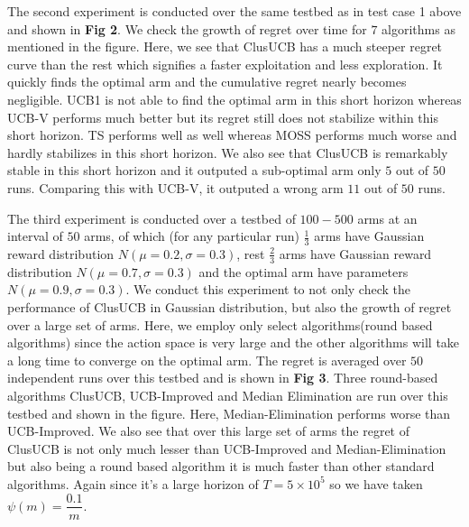 	The second experiment is conducted over the same testbed as in test case 1 above and shown in \textbf{Fig 2}. We check the growth of regret over time for $7$ algorithms as mentioned in the figure. Here, we see that ClusUCB has a much steeper regret curve than the rest which signifies a faster exploitation and less exploration. It quickly finds the optimal arm and the cumulative regret nearly becomes negligible. UCB1 is not able to find the optimal arm in this short horizon whereas UCB-V performs much better but its regret still does not stabilize within this short horizon. TS performs well as well whereas MOSS performs much worse and hardly stabilizes in this short horizon. We also see that ClusUCB is remarkably stable in this short horizon and it outputed a sub-optimal arm only $5$ out of $50$ runs. Comparing this with UCB-V, it outputed a wrong arm $11$ out of $50$ runs. 

	The third experiment is conducted over a testbed of $100-500$ arms at an interval of $50$ arms, of which (for any particular run) $\frac{1}{3}$ arms have Gaussian reward distribution  $N(\mu =0.2,\sigma =0.3)$, rest $\frac{2}{3}$ arms have Gaussian reward distribution  $N(\mu =0.7,\sigma =0.3)$ and the optimal arm have parameters $N(\mu =0.9,\sigma =0.3)$. We conduct this experiment to not only check the performance of ClusUCB in Gaussian distribution, but also the growth of regret over a large set of arms. Here, we employ only select algorithms(round based algorithms) since the action space is very large and the other algorithms will take a long time to converge on the optimal arm. The regret is averaged over $50$ independent runs over this testbed and is shown in \textbf{Fig 3}. Three round-based algorithms ClusUCB, UCB-Improved and Median Elimination are run over this testbed and shown in the figure. Here, Median-Elimination performs worse than UCB-Improved. We also see that over this large set of arms 
the regret of ClusUCB is not only much lesser than UCB-Improved and Median-Elimination but also being a round based algorithm it is much faster than other standard algorithms. Again since it's a  large horizon of $T=5\times 10^{5}$ so we have taken $\psi(m)=\dfrac{0.1}{m}$.


